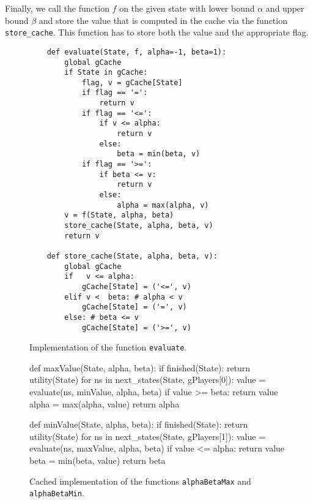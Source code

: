 Finally, we call the function $f$ on the given state with lower bound $\alpha$ and upper bound $\beta$ and
store the value that is computed in the cache via the function \texttt{store\_cache}.  This function has to
store both the value and the appropriate flag.

\begin{figure}[!ht]
\centering
\begin{verbatim}
    def evaluate(State, f, alpha=-1, beta=1):
        global gCache
        if State in gCache:
            flag, v = gCache[State]
            if flag == '=':
                return v
            if flag == '<=':
                if v <= alpha:
                    return v
                else:
                    beta = min(beta, v)
            if flag == '>=':
                if beta <= v:
                    return v
                else:
                    alpha = max(alpha, v)
        v = f(State, alpha, beta)
        store_cache(State, alpha, beta, v)
        return v

    def store_cache(State, alpha, beta, v):
        global gCache
        if   v <= alpha:
            gCache[State] = ('<=', v)
        elif v <  beta: # alpha < v
            gCache[State] = ('=', v)
        else: # beta <= v
            gCache[State] = ('>=', v)            
\end{verbatim}
\vspace*{-0.3cm}
\caption{Implementation of the function \texttt{evaluate}.}
\label{fig:evaluate}
\end{figure}
\FloatBarrier

\begin{figure}[!ht]
\centering
\begin{python3code}
def maxValue(State, alpha, beta):
    if finished(State):
        return utility(State)
    for ns in next_states(State, gPlayers[0]):
        value = evaluate(ns, minValue, alpha, beta)
        if value >= beta:
            return value
        alpha = max(alpha, value)
    return alpha

def minValue(State, alpha, beta):
    if finished(State):
        return utility(State)
    for ns in next_states(State, gPlayers[1]):
        value = evaluate(ns, maxValue, alpha, beta)
        if value <= alpha:
            return value
        beta = min(beta, value)
    return beta    
\end{python3code}
\vspace*{-0.3cm}
\caption{Cached implementation of the functions \texttt{alphaBetaMax} and \texttt{alphaBetaMin}.}
\label{fig:alphaBetaCached}
\end{figure}
\FloatBarrier

